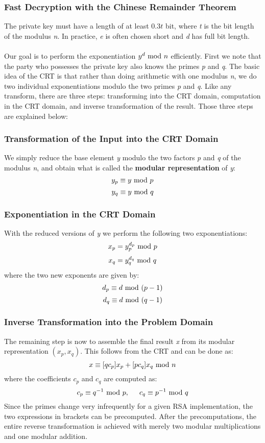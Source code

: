 \subsubsection{Fast Decryption with the Chinese Remainder Theorem}
The private key must have a length of at least $0.3t$ bit, where \textit{t} is the bit length of the modulus \textit{n}. In practice, \textit{e} is often chosen short and \textit{d} has full bit length.\\\\
Our goal is to perform the exponentiation $y^d\text{ mod } n$ efficiently. First we note that the party who possesses the private key also knows the primes \textit{p} and \textit{q}. The basic idea of the CRT is that rather than doing arithmetic with one  modulus \textit{n}, we do two individual exponentiations modulo the two  primes \textit{p} and \textit{q}. Like any transform, there are three steps: transforming into the CRT domain, computation in the CRT domain, and inverse transformation of the result. Those three steps are explained below:
\subsubsection*{Transformation of the Input into the CRT Domain}
We simply reduce the base element \textit{y} modulo the two factors \textit{p} and \textit{q} of the modulus \textit{n}, and obtain what is called the \textbf{modular representation} of \textit{y}:
$$y_p\equiv y\text{ mod } p$$
$$y_q\equiv y\text{ mod } q$$
\subsubsection*{Exponentiation in the CRT Domain}
With the reduced versions of \textit{y} we perform the following two exponentiations:
$$x_p=y_p^{d_p}\text{ mod } p$$
$$x_q=y_q^{d_q}\text{ mod } q$$
where the two new exponents are given by:
$$d_p\equiv d\text{ mod }(p-1)$$
$$d_q\equiv d\text{ mod }(q-1)$$

\newpage
\subsubsection*{Inverse Transformation into the Problem Domain}
The remaining step is now to assemble the final result \textit{x} from its modular representation $(x_p,x_q)$. This follows from the CRT and can be done as:
$$x\equiv [qc_p]x_p + [pc_q]x_q\text{ mod } n$$
where the coefficients $c_p$ and $c_q$ are computed as:
$$c_p\equiv q^{-1}\text{ mod } p,\hspace{0.5cm}c_q\equiv p^{-1}\text{ mod } q$$
Since the primes change very infrequently for a given RSA implementation, the two expressions in brackets can be precomputed. After the precomputations, the entire reverse transformation is achieved with merely two modular multiplications and one modular addition.\\

